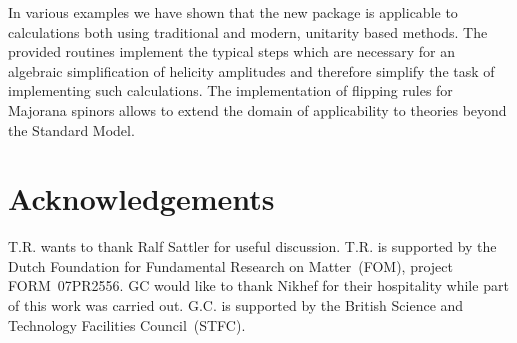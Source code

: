 \documentclass[preprint,number,12pt,sort&compress]{elsarticle}
\begin{document}
In various examples we have shown that the new package is applicable
to calculations both using traditional and modern, unitarity based
methods. The provided routines implement the typical steps which are
necessary for an algebraic simplification of helicity amplitudes
and therefore simplify the task of implementing such calculations.
The implementation of flipping rules for Majorana spinors allows to
extend the domain of applicability to theories beyond the Standard Model.

\section*{Acknowledgements}
T.R. wants to thank Ralf Sattler for useful discussion.
T.R. is supported by the Dutch Foundation for Fundamental Research
on Matter~(FOM), project FORM~07PR2556.
GC would like to thank Nikhef for their hospitality while part of this 
work was carried out.
G.C. is supported by the British Science and Technology Facilities
Council~(STFC).



\end{document}
